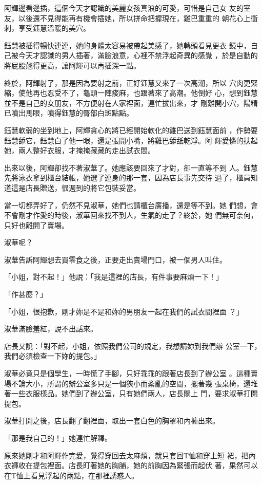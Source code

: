 阿輝邊看邊插，這個今天才認識的美麗女孩真浪的可愛，可惜是自己女
友的室友，以後還不見得能再有機會插她，所以拼命把握現在，雞巴重重的
朝花心上衝刺，享受鈺慧溫暖的美穴。

鈺慧被插得暢快連連，她的身體太容易被帶起美感了，她轉頭看見更衣
鏡中，自己被今天才認識的男人插著，滿臉浪意，心裡不禁浮起奇異的感覺
，於是自動的將屁股翹得更高，讓阿輝可以再插深一點。

終於，阿輝射了，那是因為要射之前，正好鈺慧又來了一次高潮，所以
穴肉更緊縮，使他再也忍受不了，龜頭一陣痠麻，也跟著來了高潮。他倒好
心，想到鈺慧並不是自己的女朋友，不方便射在人家裡面，連忙拔出來，才
剛離開小穴，陽精已噴出馬眼，噴得鈺慧的臀部白斑點點。

鈺慧軟弱的坐到地上，阿輝貪心的將已經開始軟化的雞巴送到鈺慧面前
，作勢要鈺慧舔它，鈺慧白了他一眼，還是張開小嘴，將雞巴舔舐乾淨。阿
輝愛憐的扶起她，兩人整好衣服，才掩掩藏藏的走出試衣間。

出來以後，阿輝卻找不著淑華了。她應該要回來了才對，卻一直等不到
人。鈺慧先將泳衣拿到櫃台結帳，她選了連身的那一套，因為店長事先交待
過了，櫃員知道這是店長贈送，很週到的將它包裝妥當。

當一切都弄好了，仍然不見淑華，她們也請櫃台廣播，還是等不到。她
們想，會不會剛才作愛的時後，淑華回來找不到人，生氣的走了？終於，她
們無可奈何，只好也離開了賣場。

淑華呢？

淑華告訴阿輝想去買零食之後，正要走出賣場門口，被一個男人叫住。

「小姐，對不起！」他說：「我是這裡的店長，有件事要麻煩一下！」

「作甚麼？」

「小姐，很抱歉，剛才妳是不是和妳的男朋友一起在我們的試衣間裡面
？」

淑華滿臉羞紅，說不出話來。

店長又說：「對不起，小姐，依照我們公司的規定，我想請妳到我們辦
公室一下，我們必須檢查一下妳的提包。」

淑華必竟只是個學生，一時慌了手腳，只好乖乖的跟著店長到了辦公室
。這種賣場不論大小，所謂的辦公室多只是一個狹小而紊亂的空間，擺著幾
張桌椅，還堆著一些衣服樣品。她們到了辦公室，只有她們兩人，店長關上
門，要求淑華打開提包。

淑華打開之後，店長翻了翻裡面，取出一套白色的胸罩和內褲出來。

「那是我自己的！」她連忙解釋。

原來她剛才和阿輝作完愛，覺得穿回去太麻煩，就只套回T恤和穿上短
裙，把內衣褲收在提包裡面。店長盯著她的胸脯，她的前胸因為緊張而起伏
著，果然可以在T恤上看見浮起的兩點，在那裡誘惑人。

